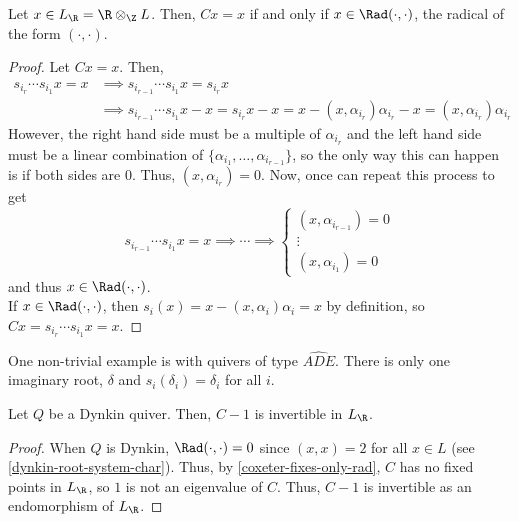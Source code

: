 \documentclass[11pt,leqno,oneside]{amsbook}
\numberwithin{thm}{section}
\renewcommand{\Q}{Q} %
\begin{document}
\begin{prop} \label{coxeter-fixes-only-rad}
  Let \(x \in L_\R = \R \otimes_\Z L\). Then, \(Cx = x\) if and only if
  \(x \in \Rad(\cdot, \cdot)\), the radical of the form \((\cdot, \cdot)\).
\end{prop}
\begin{proof}
  Let \(Cx = x\). Then,
  \begin{align*}
    s_{i_r} \cdots s_{i_1} x = x
    & \implies s_{i_{r-1}} \cdots s_{i_1}x = s_{i_r} x \\
    & \implies s_{i_{r-1}} \cdots s_{i_1}x - x = s_{i_r} x - x = x -
      (x, \alpha_{i_r})\alpha_{i_r} - x = (x, \alpha_{i_r})\alpha_{i_r}
  \end{align*}
  However, the right hand side must be a multiple of \(\alpha_{i_r}\)
  and the left hand side must be a linear combination of
  \(\{\alpha_{i_1}, \ldots, \alpha_{i_{r-1}}\}\), so the only way this
  can happen is if both sides are \(0\). Thus, \((x, \alpha_{i_r}) =
  0\). Now, once can repeat this process to get \[
    s_{i_{r-1}} \cdots s_{i_1} x = x \implies \cdots \implies
    \begin{cases}
      (x, \alpha_{i_{r-1}}) = 0 \\
      \vdots \\
      (x, \alpha_{i_1}) = 0
    \end{cases}
  \]
  and thus \(x \in \Rad(\cdot, \cdot)\). \\

  If \(x \in \Rad(\cdot, \cdot)\), then \(s_i(x) = x -
  (x,\alpha_i)\alpha_i = x\) by definition, so \(C x = s_{i_{r}}
  \cdots s_{i_1} x = x\). 
\end{proof}
\begin{example}
  One non-trivial example is with quivers of type
  \(\widehat{ADE}\). There is only one imaginary root, \(\delta\) and
  \(s_i(\delta_i) = \delta_i\) for all \(i\).
\end{example}
\begin{prop}
  Let \(\Q\) be a Dynkin quiver. Then, \(C-1\) is invertible in
  \(L_\R\). 
\end{prop}
\begin{proof}
  When \(\Q\) is Dynkin, \(\Rad(\cdot, \cdot) = 0\) since \((x,x) =
  2\) for all \(x \in L\) (see \ref{dynkin-root-system-char}). Thus,
  by \ref{coxeter-fixes-only-rad}, \(C\) has no fixed points in
  \(L_\R\), so \(1\)
  is not an eigenvalue of \(C\). Thus, \(C-1\) is invertible as an
  endomorphism of \(L_\R\).
\end{proof}
\end{document}
